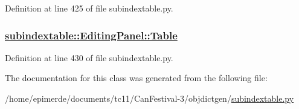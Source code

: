 Definition at line 425 of file subindextable.py.\hypertarget{classsubindextable_1_1EditingPanel_2c833d8340914c80453fbc90c54137e4}{
\subsubsection[Table]{\setlength{\rightskip}{0pt plus 5cm}\hyperlink{classsubindextable_1_1EditingPanel_2c833d8340914c80453fbc90c54137e4}{subindextable::Editing\-Panel::Table}}}
\label{classsubindextable_1_1EditingPanel_2c833d8340914c80453fbc90c54137e4}




Definition at line 430 of file subindextable.py.

The documentation for this class was generated from the following file:\begin{CompactItemize}
\item 
/home/epimerde/documents/tc11/Can\-Festival-3/objdictgen/\hyperlink{subindextable_8py}{subindextable.py}\end{CompactItemize}
